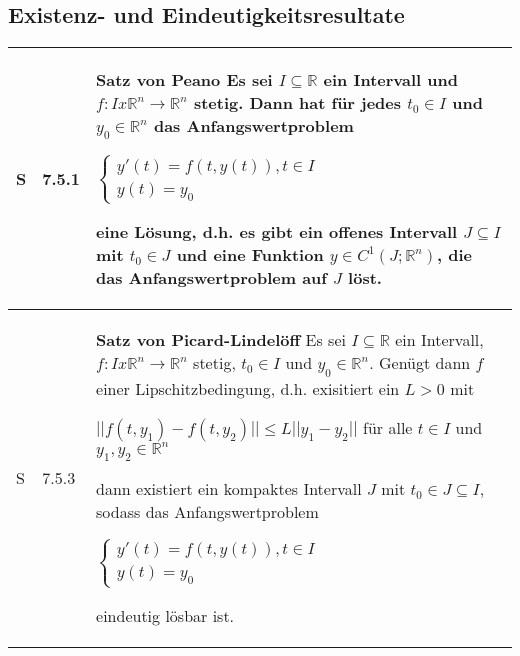 \subsection{Existenz- und Eindeutigkeitsresultate}

    \begin{longtable}{p{0.75cm} p{1cm} p{16cm}}
        \toprule

        S   & 7.5.1 &   \textbf{Satz von Peano} \hfill \break
                        Es sei $I \subseteq \mathbb{R}$ ein Intervall und $f: I x \mathbb{R}^n \rightarrow \mathbb{R}^n$ stetig. Dann hat
                        für jedes $t_0 \in I$ und $y_0 \in \mathbb{R}^n$ das Anfangswertproblem \hfill \break
                        \centerline{$   \begin{cases}
                                        y'(t) = f(t,y(t)), t\in I \\
                                        y(t) = y_0 
                                        \end{cases} $} 
                        eine Lösung, d.h. es gibt ein offenes Intervall $J \subseteq I$ mit $t_0 \in J$ und eine Funktion $y \in C^1(J;\mathbb{R}^n)$, 
                        die das Anfangswertproblem auf $J$ löst. \\
        \midrule
        S   & 7.5.3 &   \textbf{Satz von Picard-Lindelöff} \hfill \break
                        Es sei $I \subseteq \mathbb{R}$ ein Intervall, $f: I x \mathbb{R}^n \rightarrow \mathbb{R}^n$ stetig, $t_0 \in I$ und 
                        $y_0 \in \mathbb{R}^n$. Genügt dann $f$ einer Lipschitzbedingung, d.h. exisitiert ein $L > 0$ mit \hfill \break
                        \centerline{$ ||f(t,y_1) -f(t,y_2)|| \leq L||y_1 - y_2||$ für alle $t\in I$ und $y_1,y_2 \in \mathbb{R}^n $}
                        dann existiert ein kompaktes Intervall $J$ mit $t_0 \in J \subseteq I$, sodass das Anfangswertproblem \hfill \break
                        \centerline{$   \begin{cases}
                                        y'(t) = f(t,y(t)), t\in I \\
                                        y(t) = y_0 
                                        \end{cases} $}
                        eindeutig lösbar ist. \\
        \bottomrule
    \end{longtable}
    

